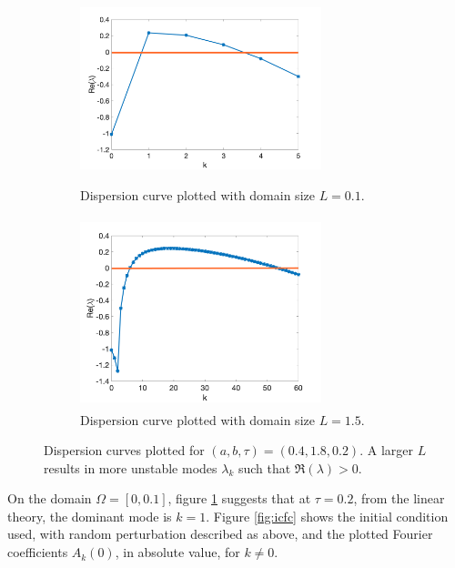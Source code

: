 \documentclass[12pt]{report}
\begin{document}
\begin{figure}[H]
    \centering
    \begin{subfigure}[b]{0.45\textwidth}
        \centering
        \includegraphics[width=7cm,height=5.5cm]{compdisp1.png}
        \caption{Dispersion curve plotted with domain size $L=0.1$.}
        \label{fig:compdisp1}
    \end{subfigure}
    \hfill
    \begin{subfigure}[b]{0.45\textwidth}
        \centering
        \includegraphics[width=7cm,height=5.5cm]{compdisp2.png}
        \caption{Dispersion curve plotted with domain size $L=1.5$.}
        \label{fig:compdisp2}
    \end{subfigure}
    \caption{Dispersion curves plotted for $(a,b,\tau)=(0.4,1.8,0.2)$. A larger $L$ results in more unstable modes $\lambda_k$ such that $\Re(\lambda)>0$. }
    \label{fig:compardisp}
\end{figure}
On the domain $\Omega=[0, 0.1]$, figure \ref{fig:compdisp1} suggests that at $\tau=0.2$, from the linear theory, the dominant mode is $k=1$. Figure \ref{fig:icfc} shows the initial condition used, with random perturbation described as above, and the plotted Fourier coefficients $A_k(0)$, in absolute value, for $k\neq0$.
\end{document}

